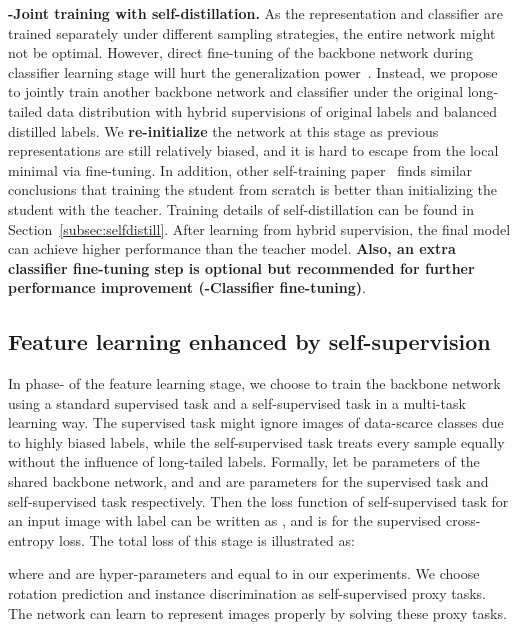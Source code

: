 \documentclass[10pt,twocolumn,letterpaper]{article}
\begin{document}
\medskip
\noindent\textbf{\uppercase\expandafter{}-Joint training with self-distillation.} As the representation and classifier are trained separately under different sampling strategies, the entire network might not be optimal. However, direct fine-tuning of the backbone network during classifier learning stage will hurt the generalization power~\cite{decoupling}. Instead, we propose to jointly train another backbone network and classifier under the original long-tailed data distribution with hybrid supervisions of original labels and balanced distilled labels. We \textbf{re-initialize} the network at this stage as previous representations are still relatively biased, and it is hard to escape from the local minimal via fine-tuning. In addition, other self-training paper~\cite{selftraining} finds similar conclusions that training the student from scratch is better than initializing the student with the teacher. Training details of self-distillation can be found in Section~\ref{subsec:selfdistill}. After learning from hybrid supervision, the final model can achieve higher performance than the teacher model. {\bf Also, an extra classifier fine-tuning step is optional but recommended for further performance improvement (\uppercase\expandafter{}-Classifier fine-tuning)}.

\subsection{Feature learning enhanced by self-supervision}
\label{subsec:selfsupervise}
In phase-\uppercase\expandafter{} of the feature learning stage, we choose to train the backbone network using a standard supervised task and a self-supervised task in a multi-task learning way. The supervised task might ignore images of data-scarce classes due to highly biased labels, while the self-supervised task treats every sample equally without the influence of long-tailed labels. Formally, let  be parameters of the shared backbone network, and  and  are parameters for the supervised task and self-supervised task respectively. Then the loss function of self-supervised task for an input image  with label  can be written as , and  is for the supervised cross-entropy loss. The total loss of this stage is illustrated as:

where  and  are hyper-parameters and equal to  in our experiments. We choose rotation prediction and instance discrimination as self-supervised proxy tasks. The network can learn to represent images properly by solving these proxy tasks.
\end{document}
